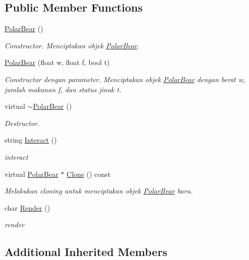 \subsection*{Public Member Functions}
\begin{DoxyCompactItemize}
\item 
\hyperlink{classPolarBear_a646f53f9fa472dcc7873e6a912cbc474}{Polar\+Bear} ()
\begin{DoxyCompactList}\small\item\em Constructor. Menciptakan objek \hyperlink{classPolarBear}{Polar\+Bear}. \end{DoxyCompactList}\item 
\hyperlink{classPolarBear_a361d624a7075b89f4276b35325fd66c2}{Polar\+Bear} (float w, float f, bool t)
\begin{DoxyCompactList}\small\item\em Constructor dengan parameter. Menciptakan objek \hyperlink{classPolarBear}{Polar\+Bear} dengan berat w, jumlah makanan f, dan status jinak t. \end{DoxyCompactList}\item 
virtual \hyperlink{classPolarBear_a84e510e1476910f33cbb0bbe2fff3566}{$\sim$\+Polar\+Bear} ()
\begin{DoxyCompactList}\small\item\em Destructor. \end{DoxyCompactList}\item 
string \hyperlink{classPolarBear_a2c266e69dd929ac3b10fe7484a77a5a4}{Interact} ()
\begin{DoxyCompactList}\small\item\em interact \end{DoxyCompactList}\item 
virtual \hyperlink{classPolarBear}{Polar\+Bear} $\ast$ \hyperlink{classPolarBear_aad58cdb9b360996a94f12ade5b6743b7}{Clone} () const 
\begin{DoxyCompactList}\small\item\em Melakukan cloning untuk menciptakan objek \hyperlink{classPolarBear}{Polar\+Bear} baru. \end{DoxyCompactList}\item 
char \hyperlink{classPolarBear_a7feccf8999fb0ab000c052583ad0217a}{Render} ()
\begin{DoxyCompactList}\small\item\em render \end{DoxyCompactList}\end{DoxyCompactItemize}
\subsection*{Additional Inherited Members}


